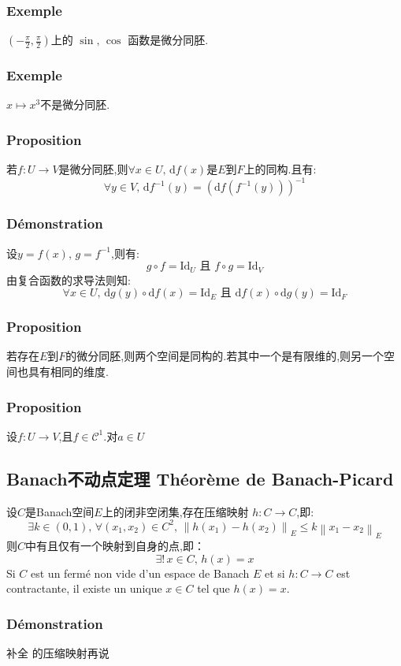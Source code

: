 \documentclass[12pt, a4paper, oneside]{ctexbook}
\newcommand{\di }{\text{d}}%
\newcommand{\Id }{\text{Id}}%
\newcommand{\C }{\mathcal{C}}%
\begin{document}
  \subsubsection{Exemple}
  $(-\frac{\pi}{2},\frac{\pi}{2})$上的 $\sin,\,\cos$ 函数是微分同胚.
  \subsubsection{Exemple}
  $x\mapsto x^3$不是微分同胚.
  \subsubsection{Proposition}
  若$f:U\rightarrow V$是微分同胚,则$\forall x\in U,\,\di f(x)$是$E$到$F$上的同构.且有:
  $$
    \forall y\in V,\,\di f^{-1}(y)=(\di f(f^{-1}(y)))^{-1}
  $$
  \subsubsection{Démonstration}
  设$y=f(x),\,g=f^{-1}$,则有:
  $$
    g\circ f=\Id_U \text{            且             }f\circ g=\Id_V
  $$
  由复合函数的求导法则知:
  $$
  \forall x\in U,\,\di g(y)\circ \di f(x)=\Id_E\text{            且             }\di f(x)\circ \di g(y)=\Id_F
  $$
  \subsubsection{Proposition}
  若存在$E$到$F$的微分同胚,则两个空间是同构的.若其中一个是有限维的,则另一个空间也具有相同的维度.
  \subsubsection{Proposition}
  设$f:U\rightarrow V$,且$f\in\C^1$.对$a\in U$

  \subsection{Banach不动点定理 Théorème de Banach-Picard}
    设$C$是Banach空间$E$上的闭非空闭集,存在压缩映射 $h:C\rightarrow C$,即:
    $$
      \exists k\in(0,1),\,\forall (x_1,x_2)\in C^2,\,\left\lVert h(x_1)-h(x_2)\right\rVert _E\leq k\left\lVert x_1-x_2\right\rVert _E
    $$
    则$C$中有且仅有一个映射到自身的点,即：
    $$
      \exists! \,x\in C,\,h(x)=x
    $$
    \indent
    Si $C$ est un fermé non vide d'un espace de Banach $E$ et si $h:C\rightarrow C$ est contractante, 
    il existe un unique $x\in C$ tel que $h(x) = x$.
    \subsubsection{Démonstration}
    补全 的压缩映射再说
\end{document}
